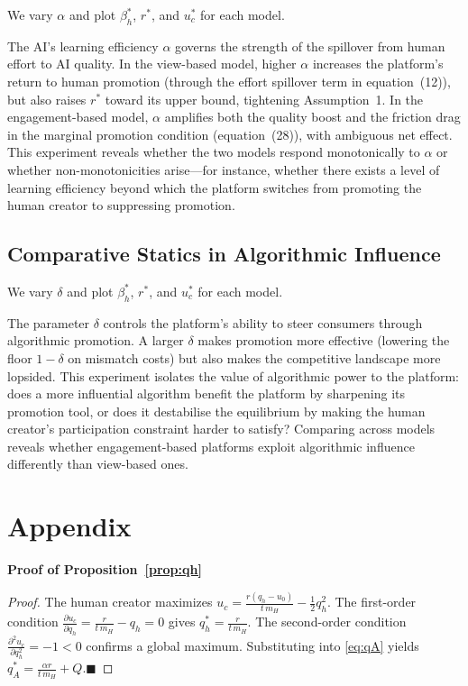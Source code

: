 \documentclass[mnsc,nonblindrev]{informs3_NoOR}
\begin{document}
We vary $\alpha$ and plot $\beta_h^*$, $r^*$, and $u_c^*$ for each model.
 
The AI's learning efficiency $\alpha$ governs the strength of the spillover from human effort to AI quality. In the view-based model, higher $\alpha$ increases the platform's return to human promotion (through the effort spillover term in equation~(12)), but also raises $r^*$ toward its upper bound, tightening Assumption~1. In the engagement-based model, $\alpha$ amplifies both the quality boost and the friction drag in the marginal promotion condition (equation~(28)), with ambiguous net effect. This experiment reveals whether the two models respond monotonically to $\alpha$ or whether non-monotonicities arise---for instance, whether there exists a level of learning efficiency beyond which the platform switches from promoting the human creator to suppressing promotion.
 
\subsection{Comparative Statics in Algorithmic Influence}
 
We vary $\delta$ and plot $\beta_h^*$, $r^*$, and $u_c^*$ for each model.
 
The parameter $\delta$ controls the platform's ability to steer consumers through algorithmic promotion. A larger $\delta$ makes promotion more effective (lowering the floor $1 - \delta$ on mismatch costs) but also makes the competitive landscape more lopsided. This experiment isolates the value of algorithmic power to the platform: does a more influential algorithm benefit the platform by sharpening its promotion tool, or does it destabilise the equilibrium by making the human creator's participation constraint harder to satisfy? Comparing across models reveals whether engagement-based platforms exploit algorithmic influence differently than view-based ones.








\appendix
\section*{Appendix}

\noindent\textbf{Proof of Proposition~\ref{prop:qh}}
\label{app:proof_qh}
\begin{proof}
The human creator maximizes $u_c = \tfrac{r(q_h - u_0)}{t\,m_H} - \tfrac{1}{2}q_h^2$. The first-order condition $\tfrac{\partial u_c}{\partial q_h} = \tfrac{r}{t\,m_H} - q_h = 0$ gives $q_h^* = \tfrac{r}{t\,m_H}$. The second-order condition $\tfrac{\partial^2 u_c}{\partial q_h^2} = -1 < 0$ confirms a global maximum. Substituting into \eqref{eq:qA} yields $q_A^* = \tfrac{\alpha r}{t\,m_H} + Q$.\hfill$\blacksquare$
\end{proof}
\end{document}
